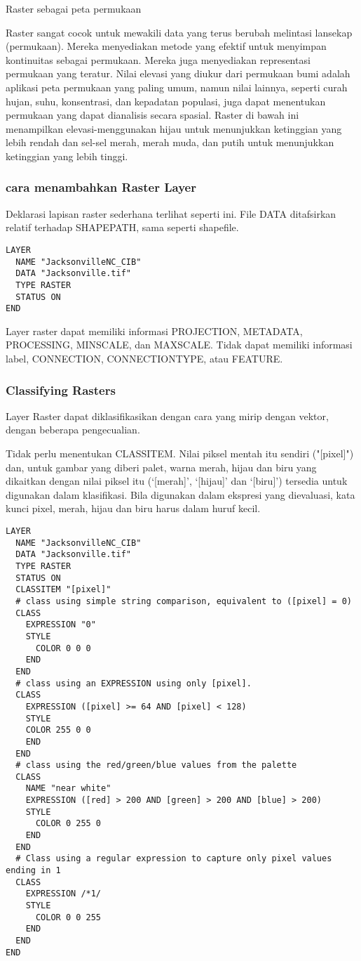 Raster sebagai peta permukaan

Raster sangat cocok untuk mewakili data yang terus berubah melintasi lansekap (permukaan). Mereka menyediakan metode yang 
efektif untuk menyimpan kontinuitas sebagai permukaan. Mereka juga menyediakan representasi permukaan yang teratur. Nilai 
elevasi yang diukur dari permukaan bumi adalah aplikasi peta permukaan yang paling umum, namun nilai lainnya, seperti curah
hujan, suhu, konsentrasi, dan kepadatan populasi, juga dapat menentukan permukaan yang dapat dianalisis secara spasial. Raster
di bawah ini menampilkan elevasi-menggunakan hijau untuk menunjukkan ketinggian yang lebih rendah dan sel-sel merah, merah muda, 
dan putih untuk menunjukkan ketinggian yang lebih tinggi.


\subsubsection{cara menambahkan Raster Layer}
Deklarasi lapisan raster sederhana terlihat seperti ini. File DATA ditafsirkan relatif terhadap SHAPEPATH, sama seperti shapefile.

\begin{verbatim}
LAYER
  NAME "JacksonvilleNC_CIB"
  DATA "Jacksonville.tif"
  TYPE RASTER
  STATUS ON
END
\end{verbatim}

Layer raster dapat memiliki informasi PROJECTION, METADATA, PROCESSING, MINSCALE, dan MAXSCALE. Tidak dapat memiliki informasi label, CONNECTION, CONNECTIONTYPE, atau FEATURE.

\subsubsection{Classifying Rasters}
Layer Raster dapat diklasifikasikan dengan cara yang mirip dengan vektor, dengan beberapa pengecualian.

Tidak perlu menentukan CLASSITEM. Nilai piksel mentah itu sendiri ("[pixel]") dan, untuk gambar yang diberi palet, warna merah, hijau dan biru yang dikaitkan dengan nilai piksel itu (`[merah]', `[hijau]' dan `[biru]') tersedia untuk digunakan dalam klasifikasi. Bila digunakan dalam ekspresi yang dievaluasi, kata kunci pixel, merah, hijau dan biru harus dalam huruf kecil.

\begin{lstlisting}
LAYER
  NAME "JacksonvilleNC_CIB"
  DATA "Jacksonville.tif"
  TYPE RASTER
  STATUS ON
  CLASSITEM "[pixel]"
  # class using simple string comparison, equivalent to ([pixel] = 0)
  CLASS
    EXPRESSION "0"
    STYLE
      COLOR 0 0 0
    END
  END
  # class using an EXPRESSION using only [pixel].
  CLASS
    EXPRESSION ([pixel] >= 64 AND [pixel] < 128)
    STYLE
    COLOR 255 0 0
    END
  END
  # class using the red/green/blue values from the palette
  CLASS
    NAME "near white"
    EXPRESSION ([red] > 200 AND [green] > 200 AND [blue] > 200)
    STYLE
      COLOR 0 255 0
    END
  END
  # Class using a regular expression to capture only pixel values ending in 1
  CLASS
    EXPRESSION /*1/
    STYLE
      COLOR 0 0 255
    END
  END
END
\end{lstlisting}


